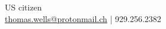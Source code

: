 \documentclass[letterpaper]{deedy-resume-openfont} %
\begin{document}

\lastupdated %

{
US citizen \\
\href{mailto:thomas.wells@protonmail.ch}{thomas.wells@protonmail.ch} | 929.256.2382 
}

\end{document}
